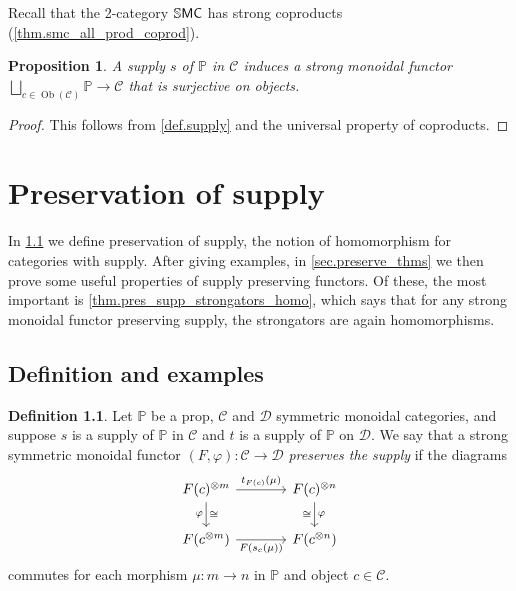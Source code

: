 \documentclass[11pt, oneside, article]{memoir}
\theoremstyle{plain}
\newtheorem{proposition}[theorem]{Proposition}
\theoremstyle{definition}
\newtheorem{definition}[theorem]{Definition}
\theoremstyle{remark}
\newcommand{\Set}[1]{\mathrm{#1}}%
\newcommand{\cat}[1]{\mathcal{#1}}%
\newcommand{\Cat}[1]{{\mathsf{#1}}}%
\newcommand{\CCat}[1]{\mathbb{\StrLeft{#1}{1}}\Cat{\StrGobbleLeft{#1}{1}}}%
\DeclareMathOperator{\ob}{\Set{Ob}}
\newcommand{\tpow}[1]{^{\otimes #1}}
\newcommand{\ssmc}{\CCat{SMC}}
\newcommand{\pp}{\mathbb{P}}
\begin{document}
Recall that the 2-category $\ssmc$ has strong coproducts (\cref{thm.smc_all_prod_coprod}).
\begin{proposition}
A supply $s$ of $\pp$ in $\cat{C}$ induces a strong monoidal functor $\bigsqcup_{c\in\ob(\cat{C})}\pp\to\cat{C}$ that is surjective on objects.
\end{proposition}
\begin{proof}
This follows from \cref{def.supply} and the universal property of coproducts.
\end{proof}

\chapter{Preservation of supply}

In \cref{sec.pres_supply} we define preservation of supply, the notion of homomorphism for categories with supply. After giving examples, in \cref{sec.preserve_thms} we then prove some useful properties of supply preserving functors. Of these, the most important is \cref{thm.pres_supp_strongators_homo}, which says that for any strong monoidal functor preserving supply, the strongators are again homomorphisms.


\section{Definition and examples}\label{sec.pres_supply}

\begin{definition}\label{def.preserve_supply}
Let $\pp$ be a prop, $\cat{C}$ and $\cat{D}$ symmetric monoidal categories, and suppose $s$ is a supply of $\pp$ in $\cat{C}$ and $t$ is a supply of $\pp$ on $\cat{D}$. We say that a strong symmetric monoidal functor $(F,\varphi)\colon\cat{C}\to\cat{D}$ \emph{preserves the supply} if the diagrams 
\begin{equation}\label{eqn.unpack_preserve_supply}
	\begin{tikzcd}[column sep=large]
  	F(c)\tpow{m}\ar[r, "t_{F(c)}(\mu)"]\ar[d, "\varphi"', "\cong"]&
  	F(c)\tpow{n}\ar[d, "\varphi", "\cong"']\\
  	F(c\tpow{m})\ar[r, "F(s_c(\mu))"']&
  	F(c\tpow{n})
  \end{tikzcd}
\end{equation}
commutes for each morphism $\mu\colon m\to n$ in $\pp$ and object $c\in\cat{C}$.
\end{definition}
\end{document}
